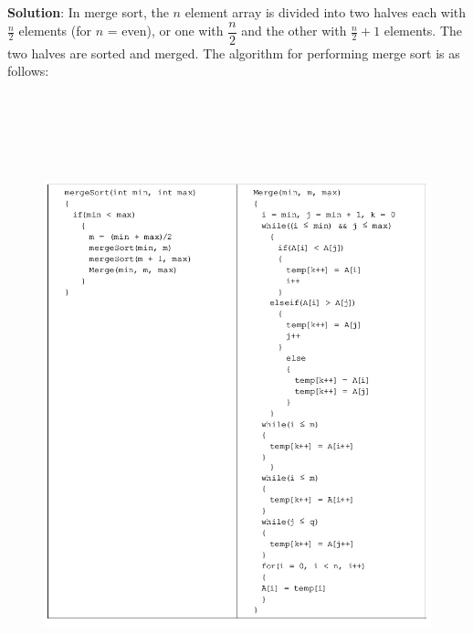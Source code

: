 \begin{latin}
\textbf{Solution}: In merge sort, the $n$ element array is divided into two halves each with $\frac{n}{2}$ elements (for $n$ = even), or one with $\dfrac{n}{2}$ and the other with $\frac{n}{2}+1$ elements. The two halves are sorted and merged. The algorithm for performing merge sort is as follows:
\begin{figure}[h!]
\centerline{ \includegraphics[width=12cm,height=18cm]{2.jpg}}
\end{figure}\\


\end{latin}
